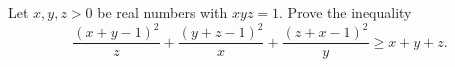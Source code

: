 Let $x,y,z>0$ be real numbers with $xyz=1$. Prove the inequality
$$\frac{(x+y-1)^2}{z} + \frac{(y+z-1)^2}{x} + \frac{(z+x-1)^2}{y} \geq x+y+z.$$